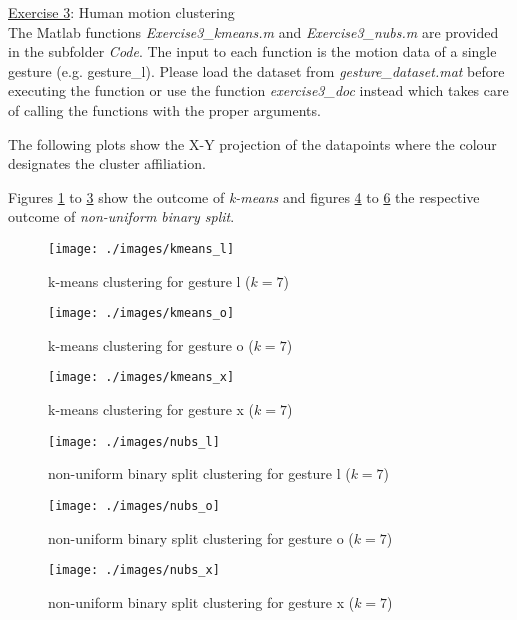 \FloatBarrier
\newpage

\ul{Exercise 3}: Human motion clustering \\[3mm]

The Matlab functions \textit{Exercise3\_kmeans.m} and
\textit{Exercise3\_nubs.m} are provided in the subfolder
\textit{Code}. The input to each function is
the motion data of a single gesture (e.g. gesture\_l). Please load the
dataset from \textit{gesture\_dataset.mat} before executing
the function or use the function \emph{exercise3\_doc} instead which takes care of calling the functions with the proper arguments.

The following plots show the X-Y projection of the datapoints where the colour designates the cluster affiliation.

Figures \ref{fig:k_means_gesture_l} to \ref{fig:k_means_gesture_x} show
the outcome of \emph{k-means} and figures
\ref{fig:nubs_gesture_l} to \ref{fig:nubs_gesture_x} the respective outcome of \emph{non-uniform binary split}.

\begin{figure}[h]
  \centering
  \texttt{[image: ./images/kmeans\_l]}
  \caption{k-means clustering for gesture l ($k=7$)}
  \label{fig:k_means_gesture_l}
\end{figure}
\begin{figure}[h]
  \centering
  \texttt{[image: ./images/kmeans\_o]}
  \caption{k-means clustering for gesture o ($k=7$)}
  \label{fig:k_means_gesture_o}
\end{figure}
\begin{figure}[h]
  \centering
  \texttt{[image: ./images/kmeans\_x]}
  \caption{k-means clustering for gesture x ($k=7$)}
  \label{fig:k_means_gesture_x}
\end{figure}


\begin{figure}[h]
  \centering
  \texttt{[image: ./images/nubs\_l]}
  \caption{non-uniform binary split clustering for gesture l ($k=7$)}
  \label{fig:nubs_gesture_l}
\end{figure}
\begin{figure}[h]
  \centering
  \texttt{[image: ./images/nubs\_o]}
  \caption{non-uniform binary split clustering for gesture o ($k=7$)}
  \label{fig:nubs_gesture_o}
\end{figure}
\begin{figure}[h]
  \centering
  \texttt{[image: ./images/nubs\_x]}
  \caption{non-uniform binary split clustering for gesture x ($k=7$)}
  \label{fig:nubs_gesture_x}
\end{figure}


